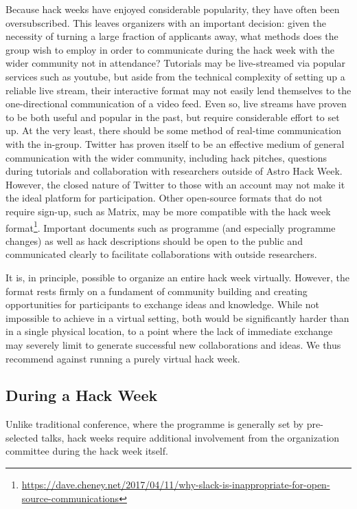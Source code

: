 Because hack weeks have enjoyed considerable popularity, they have often been oversubscribed. This leaves organizers with an important decision: given the necessity of turning a large fraction of applicants away, what methods does the group wish to employ in order to communicate during the hack week with the wider community not in attendance? Tutorials may be live-streamed via popular services such as youtube, but aside from the technical complexity of setting up a reliable live stream, their interactive format may not easily lend themselves to the one-directional communication of a video feed. Even so, live streams have proven to be both useful and popular in the past, but require considerable effort to set up. At the very least, there should be some method of real-time communication with the in-group. Twitter has proven itself to be an effective medium of general communication with the wider community, including hack pitches, questions during tutorials and collaboration with researchers outside of Astro Hack Week. However, the closed nature of Twitter to those with an account may not make it the ideal platform for participation. Other open-source formats that do not require sign-up, such as Matrix, may be more compatible with the hack week format\footnote{\url{https://dave.cheney.net/2017/04/11/why-slack-is-inappropriate-for-open-source-communications}}. Important documents such as programme (and especially programme changes) as well as hack descriptions should be open to the public and communicated clearly to facilitate collaborations with outside researchers.

It is, in principle, possible to organize an entire hack week virtually. However, the format rests firmly on a fundament of community building and creating opportunities for participants to exchange ideas and knowledge. While not impossible to achieve in a virtual setting, both would be significantly harder than in a single physical location, to a point where the lack of immediate exchange may severely limit to generate successful new collaborations and ideas. We thus recommend against running a purely virtual hack week.

\subsection{During a Hack Week}

Unlike traditional conference, where the programme is generally set by pre-selected talks, hack weeks require additional involvement from the organization committee during the hack week itself.

